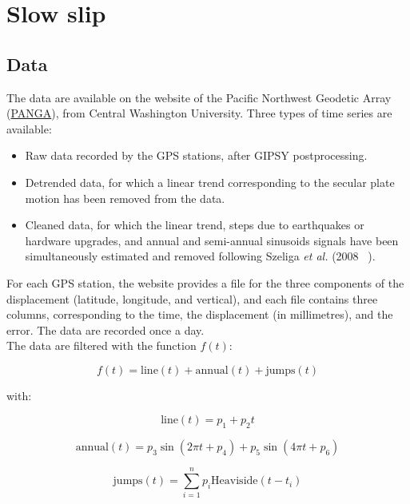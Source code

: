 \documentclass[main.tex]{subfiles}
\begin{document}
\part{Slow slip}

\chapter{Data}

The data are available on the website of the Pacific Northwest Geodetic Array (\href{http://www.geodesy.cwu.edu/}{PANGA}), from Central Washington University. Three types of time series are available:

\begin{itemize}
\item Raw data recorded by the GPS stations, after GIPSY postprocessing.
\item Detrended data, for which a linear trend corresponding to the secular plate motion has been removed from the data.
\item Cleaned data, for which the linear trend, steps due to earthquakes or hardware upgrades, and annual and semi-annual sinusoids signals have been simultaneously estimated and removed following Szeliga \textit{et al.} (2008 ~\cite{SZE_2008}).
\end{itemize}

For each GPS station, the website provides a file for the three components of the displacement (latitude, longitude, and vertical), and each file contains three columns, corresponding to the time, the displacement (in millimetres), and the error. The data are recorded once a day. \\

The data are filtered with the function $f (t)$:

\begin{equation}
f (t) = \textrm{line} (t) + \textrm{annual} (t) + \textrm{jumps} (t)
\end{equation}

with:

\begin{equation}
\textrm{line} (t) = p_1 + p_2 t
\end{equation}

\begin{equation}
\textrm{annual} (t) = p_3 \sin (2 \pi t + p_4) + p_5 \sin (4 \pi t + p_6)
\end{equation}

\begin{equation}
\textrm{jumps} (t) = \sum_{i = 1}^{n} p_i \textrm{Heaviside} (t - t_i)
\end{equation}
\end{document}
